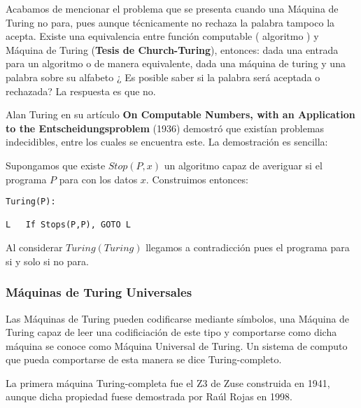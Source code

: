 Acabamos de mencionar el problema que se presenta cuando una Máquina de Turing no para, pues aunque técnicamente no rechaza la palabra tampoco la acepta. Existe una equivalencia entre función computable ( algoritmo ) y Máquina de Turing (\textbf{Tesis de Church-Turing}), entonces: dada una entrada para un algoritmo o de manera equivalente, dada una máquina de turing y una palabra sobre su alfabeto ¿ Es posible saber si la palabra será aceptada o rechazada? La respuesta es que no.

\vspace{10px}

Alan Turing en su artículo \textbf{On Computable Numbers, with an Application to the Entscheidungsproblem} (1936) demostró que existían problemas indecidibles, entre los cuales se encuentra este. La demostración es sencilla:

\vspace{10px}

Supongamos que existe $Stop(P,x)$ un algoritmo capaz de averiguar si el programa $P$ para con los datos $x$. Construimos entonces:

\begin{lstlisting}
Turing(P):

L	If Stops(P,P), GOTO L
\end{lstlisting}

\vspace{0.5cm}

Al considerar $Turing(Turing)$ llegamos a contradicción pues el programa para si y solo si no para.

\subsubsection{Máquinas de Turing Universales}

Las Máquinas de Turing pueden codificarse mediante símbolos, una Máquina de Turing capaz de leer una codificiación de este tipo y comportarse como dicha máquina se conoce como Máquina Universal de Turing. Un sistema de computo que pueda comportarse de esta manera se dice Turing-completo.

\vspace{10px}

La primera máquina Turing-completa fue el Z3 de Zuse construida en 1941, aunque dicha propiedad fuese demostrada por Raúl Rojas en 1998.

\vspace{10px}

